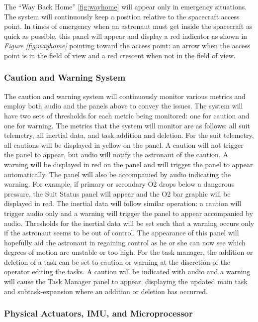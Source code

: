 \documentclass{article}
\let\Oldsubsubsection\subsubsection
\renewcommand{\subsubsection}{\FloatBarrier\Oldsubsubsection}
\begin{document}
The “Way Back Home” \ref{fig:wayhome} will appear only in emergency situations. The system will continuously keep a position relative to the spacecraft access point. In times of emergency when an astronaut must get inside the spacecraft as quick as possible, this panel will appear and display a red indicator as shown in \textit{Figure \ref{fig:wayhome}} pointing toward the access point: an arrow when the access point is in the field of view and a red crescent when not in the field of view. 

\subsubsection{Caution and Warning System}

The caution and warning system will continuously monitor various metrics and employ both audio and the panels above to convey the issues. The system will have two sets of thresholds for each metric being monitored: one for caution and one for warning. The metrics that the system will monitor are as follows:  all suit telemetry, all inertial data, and task addition and deletion. For the suit telemetry, all cautions will be displayed in yellow on the panel. A caution will not trigger the panel to appear, but audio will notify the astronaut of the caution. A warning will be displayed in red on the panel and will trigger the panel to appear automatically. The panel will also be accompanied by audio indicating the warning. For example, if primary or secondary O2 drops below a dangerous pressure, the Suit Status panel will appear and the O2 bar graphic will be displayed in red. The inertial data will follow similar operation: a caution will trigger audio only and a warning will trigger the panel to appear accompanied by audio. Thresholds for the inertial data will be set such that a warning occurs only if the astronaut seems to be out of control. The appearance of this panel will hopefully aid the astronaut in regaining control as he or she can now see which degrees of motion are unstable or too high. For the task manager, the addition or deletion of a task can be set to caution or warning at the discretion of the operator editing the tasks. A caution will be indicated with audio and a warning will cause the Task Manager panel to appear, displaying the updated main task and subtask-expansion where an addition or deletion has occurred.

\subsubsection{Physical Actuators, IMU, and Microprocessor}
\end{document}
